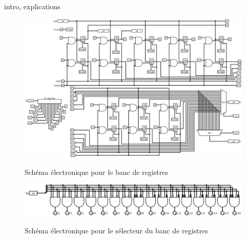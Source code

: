 \paragraph{}{
	intro, explications
}

\begin{figure}
	\centering
	\includegraphics[scale=0.3,angle=90,origin=c]{circuits/banc_reg.png}
	\label{banc_reg_circ}
	\caption{Sch\'{e}ma \'{e}lectronique pour le banc de registres}
\end{figure}

\begin{figure}
	\centering
	\includegraphics[scale=0.35,origin=c]{circuits/banc_reg_selec.png}
	\label{banc_reg_selec_circ}
	\caption{Sch\'{e}ma \'{e}lectronique pour le sélecteur du banc de registres}
\end{figure}